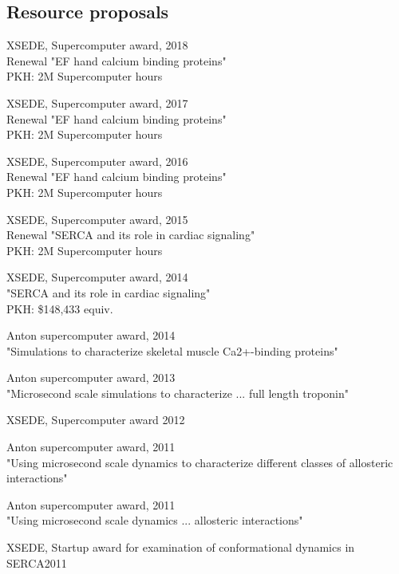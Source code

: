 \subsection{Resource proposals}

XSEDE, Supercomputer award, \dapi \hfill 2018\\
Renewal "EF hand calcium binding proteins" \\
PKH: 2M Supercomputer hours

XSEDE, Supercomputer award, \dapi \hfill 2017\\
Renewal "EF hand calcium binding proteins" \\
PKH: 2M Supercomputer hours

XSEDE, Supercomputer award, \dapi \hfill 2016\\
Renewal "EF hand calcium binding proteins" \\
PKH: 2M Supercomputer hours

XSEDE, Supercomputer award, \dapi \hfill 2015\\
Renewal "SERCA and its role in cardiac signaling" \\
PKH: 2M Supercomputer hours

XSEDE, Supercomputer award, \dapi \hfill 2014\\
"SERCA and its role in cardiac signaling" \\
PKH: \$148,433 equiv.  

Anton supercomputer award, \dacoi \hfill 2014\\
"Simulations to characterize skeletal muscle Ca2+-binding proteins" 

Anton supercomputer award, \dacoi \hfill 2013 \\
"Microsecond scale simulations to characterize ... full length troponin"

XSEDE, Supercomputer award \dacoi \hfill 2012 

Anton supercomputer award,  \hfill 2011 \\
"Using microsecond scale dynamics to characterize different classes of allosteric interactions" 

Anton supercomputer award,  \dacoi \hfill 2011 \\
"Using microsecond scale dynamics ...  allosteric interactions"

XSEDE,  Startup award for examination of conformational dynamics in SERCA\dapi \hfill 2011 